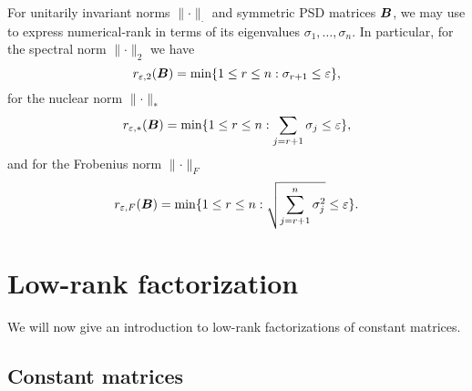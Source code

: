 For unitarily invariant norms $\lVert \cdot \rVert _{\cdot}$ and 
symmetric \gls{PSD} matrices $\boldsymbol{B}$, we may use
\cite[theorem~5]{mirsky1960truncation} to express \gls{numerical-rank} in terms
of its eigenvalues $\sigma_1, \dots, \sigma_n$.
In particular, for the spectral norm $\lVert \cdot \rVert _2$ we have
\begin{equation}
    r_{\varepsilon, 2}(\boldsymbol{B}) = \min \{1 \leq r \leq n: \sigma_{r+1} \leq \varepsilon \},
    \label{equ:3-nystrom-numerical-rank-spectral-norm}
\end{equation}
for the nuclear norm $\lVert \cdot \rVert _{\ast}$
\begin{equation}
    r_{\varepsilon, \ast}(\boldsymbol{B}) = \min \{1 \leq r \leq n: \sum_{j=r+1} \sigma_{j} \leq \varepsilon \},
    \label{equ:3-nystrom-numerical-rank-nuclear-norm}
\end{equation}
and for the Frobenius norm $\lVert \cdot \rVert _F$
\begin{equation}
    r_{\varepsilon, F}(\boldsymbol{B}) = \min \{1 \leq r \leq n: \sqrt{\sum_{j=r+1}^n \sigma_{j}^2} \leq \varepsilon \}.
    \label{equ:3-nystrom-numerical-rank-frobenius-norm}
\end{equation}


\section{Low-rank factorization}
\label{sec:3-nystrom-nystrom}

We will now give an introduction to low-rank factorizations of
constant matrices.

\subsection{Constant matrices}
\label{subsec:3-nystrom-factorization-constant-matrices}

